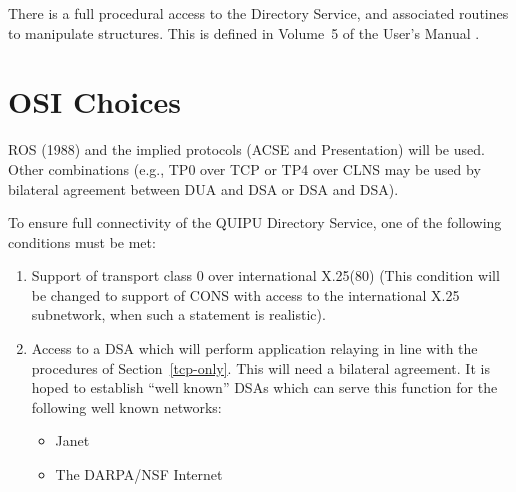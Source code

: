 There is a full procedural access to the Directory Service, and associated
routines to manipulate structures.  This is defined in Volume~5 of the User's Manual
\cite{QUIPU.Manual}.

\section {OSI Choices}

ROS (1988) and the implied protocols (ACSE and Presentation) will be used.
Other combinations (e.g., TP0 over TCP or TP4 over CLNS may be used by
bilateral agreement between DUA and DSA or DSA and DSA).

To ensure full connectivity of the QUIPU Directory Service, one of the
following conditions must be met:

\begin {enumerate}
\item Support of transport class 0 over international X.25(80) (This condition
will be changed to support of CONS with access to the international X.25
subnetwork, when such a statement is realistic).

\item Access to a DSA which will perform application relaying in line with
the procedures of Section~\ref {tcp-only}.
This will need a bilateral agreement.  It is hoped to establish ``well
known'' DSAs which can serve this function for the following well known
networks:
\begin {itemize}
\item  Janet
\item  The DARPA/NSF Internet
\end {itemize}
\end {enumerate}



